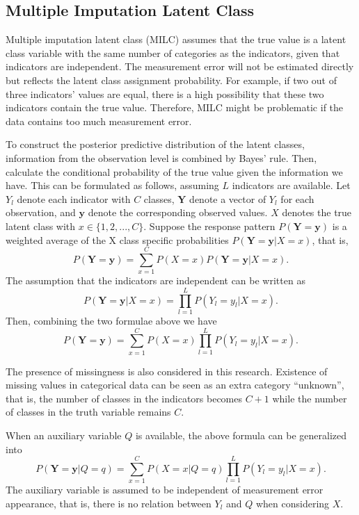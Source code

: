 \documentclass[oneside,a4paper]{article}
\begin{document}
\subsection{Multiple Imputation Latent Class}
Multiple imputation latent class (MILC) assumes that the true value is a latent class variable with the same number of categories as the indicators, given that indicators are independent. The measurement error will not be estimated directly but reflects the latent class assignment probability. For example, if two out of three indicators’ values are equal, there is a high possibility that these two indicators contain the true value. Therefore, MILC might be problematic if the data contains too much measurement error.

To construct the posterior predictive distribution of the latent classes, information from the observation level is combined by Bayes’ rule. Then, calculate the conditional probability of the true value given the information we have. This can be formulated as follows, assuming $L$ indicators are available. Let $Y_l$ denote each indicator with $C$ classes, $\textbf{Y}$ denote a vector of $Y_l$ for each observation, and $\textbf{y}$ denote the corresponding observed values. $X$ denotes the true latent class with $x \in\{1,2,...,C\}$. Suppose the response pattern $P(\textbf{Y}=\textbf{y})$ is a weighted average of the X class specific probabilities $P(\textbf{Y}=\textbf{y}|X=x)$, that is,
\begin{equation}
P(\textbf{Y} = \textbf{y})=\sum_{x=1}^C P(X=x) P(\textbf{Y}=\textbf{y} | X=x).
\end{equation}
The assumption that the indicators are independent can be written as 
\begin{equation}
 P(\textbf{Y}=\textbf{y}| X=x) = \prod_{l=1}^L P(Y_l=y_l | X=x).
\end{equation}
Then, combining the two formulae above we have 
\begin{equation}
P(\textbf{Y}=\textbf{y}) = \sum_{x=1}^C P(X=x) \prod_{l=1}^L P(Y_l=y_l | X=x).
\end{equation}

The presence of missingness is also considered in this research. Existence of missing values in categorical data can be seen as an extra category “unknown”, that is, the number of classes in the indicators becomes $C+1$ while the number of classes in the truth variable remains $C$. 

When an auxiliary variable $Q$ is available, the above formula can be generalized into 
\begin{equation}
P(\textbf{Y} = \textbf{y} |Q=q) = \sum_{x=1}^C P(X=x | Q=q) \prod_{l=1}^L P(Y_l=y_l | X=x).
\end{equation}
The auxiliary variable is assumed to be independent of measurement error appearance, that is, there is no relation between $Y_l$ and $Q$ when considering $X$. 
\end{document}
